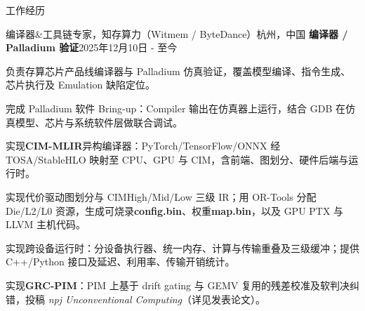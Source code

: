 \documentclass{resume} %
\begin{document}
\begin{rSection}{工作经历}

\begin{rSubsection}{编译器\&工具链专家，知存算力（Witmem / ByteDance）}{杭州，中国}
{\textbf{编译器 / Palladium 验证}}{2025年12月10日 - 至今}
\item {负责存算芯片产品线编译器与 Palladium 仿真验证，覆盖模型编译、指令生成、芯片执行及 Emulation 缺陷定位。}\\
\item {完成 Palladium 软件 Bring-up：Compiler 输出在仿真器上运行，结合 GDB 在仿真模型、芯片与系统软件层做联合调试。}\\
\item {实现{\textbf{CIM-MLIR}}异构编译器：PyTorch/TensorFlow/ONNX 经 TOSA/StableHLO 映射至 CPU、GPU 与 CIM，含前端、图划分、硬件后端与运行时。}\\
\item {实现代价驱动图划分与 CIMHigh/Mid/Low 三级 IR；用 OR-Tools 分配 Die/L2/L0 资源，生成可烧录{\textbf{config.bin}}、权重{\textbf{map.bin}}，以及 GPU PTX 与 LLVM 主机代码。}\\
\item {实现跨设备运行时：分设备执行器、统一内存、计算与传输重叠及三级缓冲；提供 C++/Python 接口及延迟、利用率、传输开销统计。}\\
\item {实现{\textbf{GRC-PIM}}：PIM 上基于 drift gating 与 GEMV 复用的残差校准及软判决纠错，投稿 {\textit{npj Unconventional Computing}}（详见发表论文）。}\\
\end{rSubsection}


\end{rSection}
\end{document}
